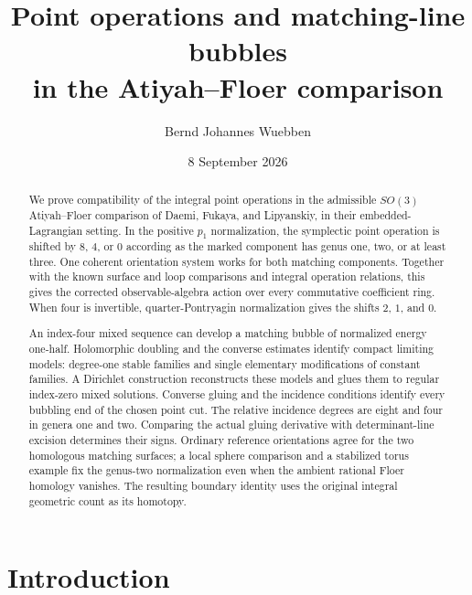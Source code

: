 \documentclass[11pt]{amsart}
\title[Point operations in the Atiyah--Floer comparison]{
Point operations and matching-line bubbles\\
in the Atiyah--Floer comparison}
\author{Bernd Johannes Wuebben}
\date{8 September 2026}
\theoremstyle{definition}
\theoremstyle{remark}
\theoremstyle{plain}
\begin{document}
\begin{abstract}
We prove compatibility of the integral point operations in the
admissible $SO(3)$ Atiyah--Floer comparison of Daemi, Fukaya,
and Lipyanskiy, in their embedded-Lagrangian setting.
In the positive $p_1$ normalization, the
symplectic point operation is shifted by $8$, $4$, or $0$
according as the marked component has genus one, two, or
at least three. One coherent orientation system works
for both matching components. Together with the known
surface and loop comparisons and integral operation
relations, this gives the corrected observable-algebra
action over every commutative coefficient ring.
When four is invertible, quarter-Pontryagin normalization
gives the shifts $2$, $1$, and $0$.

An index-four mixed sequence can develop a matching bubble
of normalized energy one-half. Holomorphic doubling and the
converse estimates identify compact limiting models:
degree-one stable families and single elementary modifications
of constant families. A Dirichlet construction reconstructs
these models and glues them to regular index-zero mixed
solutions. Converse gluing and the incidence conditions
identify every bubbling end of the chosen point cut.
The relative incidence degrees are eight and four in
genera one and two. Comparing the actual gluing derivative
with determinant-line excision determines their signs.
Ordinary reference orientations agree for the two homologous
matching surfaces; a local sphere comparison and a stabilized
torus example fix the genus-two normalization even when the
ambient rational Floer homology vanishes. The resulting
boundary identity uses the original integral geometric count
as its homotopy.
\end{abstract}

\maketitle
\newpage
\tableofcontents
\newpage

\section{Introduction}\label{sec:intro}
\end{document}

